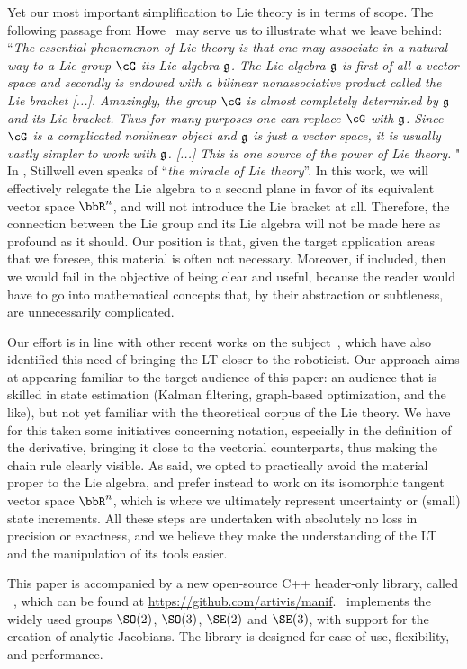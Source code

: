 Yet our most important simplification to Lie theory is in terms of scope. 
The following passage from 
Howe~\cite{Howe-Basic_Lie} may serve us to illustrate what we leave behind:
%
``\emph{The essential phenomenon of Lie theory is that one may associate in a natural way to a Lie group $\cG$ its Lie algebra $\frak{g}$. 
The Lie algebra $\frak{g}$ is first of all a vector space and secondly is endowed with a bilinear nonassociative product called the Lie bracket [...]. 
Amazingly, the group $\cG$ is almost completely determined by $\frak{g}$ and its Lie bracket. 
Thus for many purposes one can replace $\cG$ with $\frak{g}$. 
Since $\cG$ is a complicated nonlinear object and $\frak{g}$ is just a vector space, it is usually vastly simpler to work with $\frak{g}$. 
[...] 
This is one source of the power of Lie theory.%
}"
%
In \cite{STILLWELL-08}, Stillwell even speaks of ``\emph{the miracle of Lie theory}''.
In this work, we will effectively relegate the Lie algebra to a second plane in favor of its equivalent vector space $\bbR^n$, and will not introduce the Lie bracket at all.
Therefore, the connection between the Lie group and its Lie algebra will not be made here as profound as it should.
Our position is that, given the target application areas that we foresee, this material is often not necessary. 
Moreover, if included, then we would fail in the objective of being clear and useful, because the reader would have to go into mathematical concepts that, by their abstraction or subtleness, are unnecessarily complicated.



Our effort is in line with other recent works on the subject~\cite{BARFOOT-17-Estimation,EADE-Lie,forster2017-TRO}, which have also identified this need of bringing the LT closer to the roboticist.
Our approach aims at appearing familiar to the target audience of this paper: an audience that is skilled in state estimation (Kalman filtering, graph-based optimization, and the like), but not yet familiar with the theoretical corpus of the Lie theory.
%
We have for this taken some initiatives concerning notation, especially in the definition of the derivative, bringing it close to the vectorial counterparts, thus making the chain rule clearly visible.
As said, we opted to practically avoid the material proper to the Lie algebra, and prefer instead to work on its isomorphic tangent vector space $\bbR^n$, which is where we ultimately represent uncertainty or (small) state increments.
All these steps are undertaken with absolutely no loss in precision or exactness, and we believe they make the understanding of the LT and the manipulation of its tools easier.

This paper is accompanied by a new open-source C++ header-only library, called \manif\ \cite{DERAY-20-manif}, which can be found at \url{https://github.com/artivis/manif}.
\manif\ implements the widely used groups $\SO(2)$, $\SO(3)$, $\SE(2)$ and $\SE(3)$, with support for the creation of analytic Jacobians. 
The library is designed for ease of use, flexibility, and performance.
